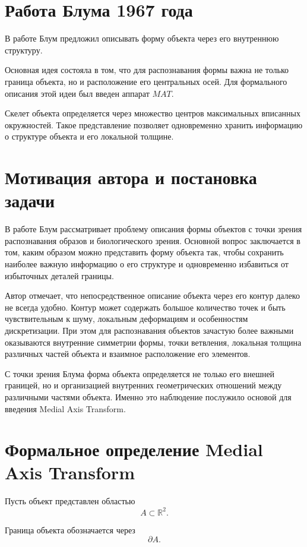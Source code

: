 \documentclass[12pt,a4paper]{article}
\begin{document}
\section{Работа Блума 1967 года}

В работе \cite{blum1967} Блум предложил описывать форму объекта через его внутреннюю структуру.

Основная идея состояла в том, что для распознавания формы важна не только граница объекта, но и расположение его центральных осей. Для формального описания этой идеи был введен аппарат $MAT$.

Скелет объекта определяется через множество центров максимальных вписанных окружностей. Такое представление позволяет одновременно хранить информацию о структуре объекта и его локальной толщине.

\section{Мотивация автора и постановка задачи}

В работе \cite{blum1967} Блум рассматривает проблему описания формы объектов с точки зрения распознавания образов и биологического зрения. Основной вопрос заключается в том, каким образом можно представить форму объекта так, чтобы сохранить наиболее важную информацию о его структуре и одновременно избавиться от избыточных деталей границы.

Автор отмечает, что непосредственное описание объекта через его контур далеко не всегда удобно. Контур может содержать большое количество точек и быть чувствительным к шуму, локальным деформациям и особенностям дискретизации. При этом для распознавания объектов зачастую более важными оказываются внутренние симметрии формы, точки ветвления, локальная толщина различных частей объекта и взаимное расположение его элементов.

С точки зрения Блума форма объекта определяется не только его внешней границей, но и организацией внутренних геометрических отношений между различными частями объекта. Именно это наблюдение послужило основой для введения Medial Axis Transform.

\section{Формальное определение Medial Axis Transform}

Пусть объект представлен областью
\[
A \subset \mathbb{R}^{2}.
\]

Граница объекта обозначается через
\[
\partial A.
\]
\end{document}
